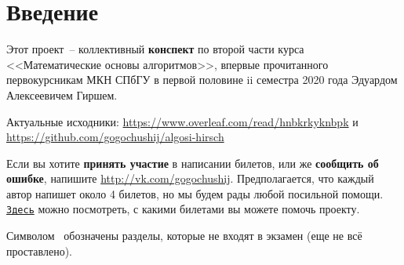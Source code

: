 \section*{Введение}

Этот проект~-- коллективный \textbf{конспект} по второй части курса <<Математические основы алгоритмов>>, впервые прочитанного первокурсникам МКН СПбГУ в первой половине ii семестра 2020 года Эдуардом Алексеевичем Гиршем.

Актуальные исходники: \url{https://www.overleaf.com/read/hnbkrkyknbpk} и \url{https://github.com/gogochushij/algosi-hirsch}

Если вы хотите \textbf{принять участие} в написании билетов, или же
\textbf{сообщить об ошибке}, напишите \url{http://vk.com/gogochushij}. Предполагается, что каждый автор напишет около 4 билетов, но мы будем рады любой посильной помощи. \href{https://docs.google.com/spreadsheets/d/17MKhLVzCyYvEKlm6W5Bb-6uUDNyv0QLmdvuh4N6JfXI/edit?usp=sharing}{\texttt{Здесь}} можно посмотреть, с какими билетами вы можете помочь проекту.

Символом \heart~обозначены разделы, которые не входят в экзамен (еще не всё проставлено).
